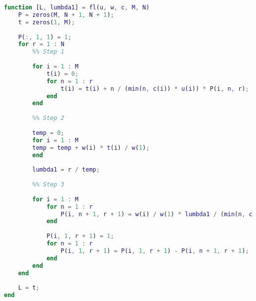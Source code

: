 \begin{lstlisting}[language={matlab}, caption={Итеративная функция решения для ССМО}, label={lst:0}, basicstyle={\footnotesize\ttfamily}, breaklines={true}]
function [L, lumbda1] = fl(u, w, c, M, N)
	P = zeros(M, N + 1, N + 1);
	t = zeros(1, M);
	
	P(:, 1, 1) = 1;
	for r = 1 : N
		%% Step 1
		
		for i = 1 : M
			t(i) = 0;
			for n = 1 : r
				t(i) = t(i) + n / (min(n, c(i)) * u(i)) * P(i, n, r);
			end
		end
		
		%% Step 2
		
		temp = 0;
		for i = 1 : M
		temp = temp + w(i) * t(i) / w(1);
		end
		
		lumbda1 = r / temp;
		
		%% Step 3
		
		for i = 1 : M
			for n = 1 : r
				P(i, n + 1, r + 1) = w(i) / w(1) * lumbda1 / (min(n, c(i)) * u(i)) * P(i, n, r);
			end
			
			P(i, 1, r + 1) = 1;
			for n = 1 : r
				P(i, 1, r + 1) = P(i, 1, r + 1) - P(i, n + 1, r + 1);
			end
		end
	end
	
	L = t;
end
\end{lstlisting}

